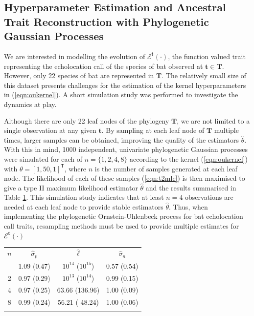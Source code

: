 \documentclass[wsdraft]{ws-rv9x6} %
\begin{document}
\subsection{Hyperparameter Estimation and Ancestral Trait Reconstruction with Phylogenetic Gaussian Processes}

We are interested in modelling the evolution of \(\mathcal{E}^{\mathbf{t}}(\cdot)\), the function valued trait representing the echolocation call of the species of bat observed at \(\mathbf{t} \in \mathbf{T}\). However, only 22 species of bat are represented in \(\mathbf{T}\). The relatively small size of this dataset presents challenges for the estimation of the kernel hyperparameters in (\ref{eqn:oukernel}). A short simulation study was performed to investigate the dynamics at play.

Although there are only 22 leaf nodes of the phylogeny \(\mathbf{T}\), we are not limited to a single observation at any given \(\mathbf{t}\). By sampling at each leaf node of \(\mathbf{T}\) multiple times, larger samples can be obtained, improving the quality of the estimators \(\hat{\theta}\). With this in mind, 1000 independent, univariate phylogenetic Gaussian processes were simulated for each of \(n = \{1,2,4,8\}\) according to the kernel (\ref{eqn:oukernel}) with \(\theta = [1,50,1]^{\mathsf{T}}\), where \(n\) is the number of samples generated at each leaf node. The likelihood of each of these samples (\ref{eqn:t2mle}) is then maximised to give a type II maximum likelihood estimator \(\hat{\theta}\) and the results summarised in Table \ref{tab::ind_simulation}. This simulation study indicates that at least \(n = 4\) observations are needed at each leaf node to provide stable estimators \(\hat{\theta}\). Thus, when implementing the phylogenetic Ornstein-Uhlenbeck process for bat echolocation call traits, resampling methods must be used to provide multiple estimates for \(\mathcal{E}^{\mathbf{t}}(\cdot)\)

\begin{table}[ht]
	{
		\begin{tabular}{@{}cccc@{}} \toprule
			\(n\)  & \(\hat{\sigma}_p \) & \(\hat{\ell}\) & \(\hat{\sigma}_n\) \\
			\colrule
			1 & 1.09 (0.47) & \(10^{14}\) (\(10^{15}\)) & 0.57 (0.54) \\
			2 & 0.97 (0.29) & \(10^{13}\) (\(10^{14}\)) & 0.99 (0.15) \\
			4 & 0.97 (0.25) & 63.66 (136.96) & 1.00 (0.09) \\
			8 & 0.99 (0.24) & 56.21 ( 48.24) & 1.00 (0.06) \\			
			\botrule
		\end{tabular}
	}
	\label{tab::ind_simulation}
\end{table}
\end{document}
